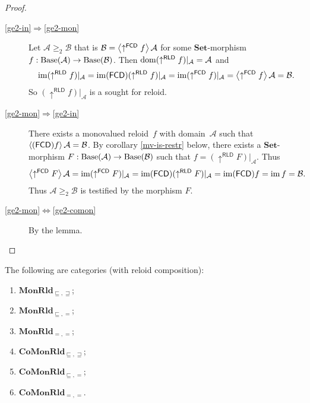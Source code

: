\begin{proof}
~
\begin{description}
\item [{\ref{ge2-in}$\Rightarrow$\ref{ge2-mon}}] Let $\mathcal{A}\ge_{2}\mathcal{B}$
that is $\mathcal{B}=\left\langle \uparrow^{\mathsf{FCD}}f\right\rangle\mathcal{A}$
for some $\mathbf{Set}$-morphism $f:\operatorname{Base}(\mathcal{A})\rightarrow\operatorname{Base}(\mathcal{B})$.
Then $\operatorname{dom}(\uparrow^{\mathsf{RLD}}f)|_{\mathcal{A}}=\mathcal{A}$
and 
\[
\operatorname{im}(\uparrow^{\mathsf{RLD}}f)|_{\mathcal{A}}=\operatorname{im}(\mathsf{FCD})(\uparrow^{\mathsf{RLD}}f)|_{\mathcal{A}}=\operatorname{im}(\uparrow^{\mathsf{FCD}}f)|_{\mathcal{A}}=\left\langle \uparrow^{\mathsf{FCD}}f\right\rangle\mathcal{A}=\mathcal{B}.
\]
So $(\uparrow^{\mathsf{RLD}}f)|_{\mathcal{A}}$ is a sought for reloid.
\item [{\ref{ge2-mon}$\Rightarrow$\ref{ge2-in}}] There exists a monovalued reloid~$f$ with domain~$\mathcal{A}$
such that $\left\langle (\mathsf{FCD}) f\right\rangle\mathcal{A}=\mathcal{B}$.
By corollary \ref{mv-is-restr}
below, there exists a $\mathbf{Set}$-morphism $F:\operatorname{Base}(\mathcal{A})\rightarrow\operatorname{Base}(\mathcal{B})$
such that $f=(\uparrow^{\mathsf{RLD}}F)|_{\mathcal{A}}$. Thus
\[
\left\langle \uparrow^{\mathsf{FCD}}F\right\rangle\mathcal{A}=\operatorname{im}(\uparrow^{\mathsf{FCD}}F)|_{\mathcal{A}}=\operatorname{im}(\mathsf{FCD})(\uparrow^{\mathsf{RLD}}F)|_{\mathcal{A}}=\operatorname{im}(\mathsf{FCD}) f=\operatorname{im} f=\mathcal{B}.
\]
Thus $\mathcal{A}\ge_{2}\mathcal{B}$ is testified by the morphism
$F$.
\item [{\ref{ge2-mon}$\Leftrightarrow$\ref{ge2-comon}}] By the lemma.
\end{description}
\end{proof}
\begin{thm}
The following are categories (with reloid composition):
\begin{enumerate}
\item \label{monrld-le-ge}$\mathbf{MonRld}_{\sqsubseteq,\sqsupseteq}$;
\item \label{monrld-le-eq}$\mathbf{MonRld}_{\sqsubseteq,=}$;
\item \label{monrld-eq-eq}$\mathbf{MonRld}_{=,=}$;
\item $\mathbf{CoMonRld}_{\sqsubseteq,\sqsupseteq}$;
\item $\mathbf{CoMonRld}_{\sqsubseteq,=}$;
\item $\mathbf{CoMonRld}_{=,=}$.
\end{enumerate}
\end{thm}
